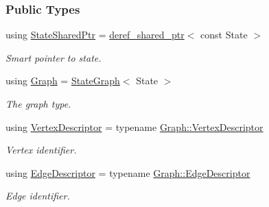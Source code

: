 \subsubsection*{Public Types}
\begin{DoxyCompactItemize}
\item 
using \hyperlink{structslb_1_1core_1_1ui_1_1CurrentStyles_a2e3a5865892f484dcf9c94ac70bc19c2}{State\+Shared\+Ptr} = \hyperlink{classslb_1_1core_1_1util_1_1deref__shared__ptr}{deref\+\_\+shared\+\_\+ptr}$<$ const State $>$\hypertarget{structslb_1_1core_1_1ui_1_1CurrentStyles_a2e3a5865892f484dcf9c94ac70bc19c2}{}\label{structslb_1_1core_1_1ui_1_1CurrentStyles_a2e3a5865892f484dcf9c94ac70bc19c2}

\begin{DoxyCompactList}\small\item\em Smart pointer to state. \end{DoxyCompactList}\item 
using \hyperlink{structslb_1_1core_1_1ui_1_1CurrentStyles_ac27c6fba620b638233a5c620f68c89bc}{Graph} = \hyperlink{structslb_1_1core_1_1ui_1_1StateGraph}{State\+Graph}$<$ State $>$\hypertarget{structslb_1_1core_1_1ui_1_1CurrentStyles_ac27c6fba620b638233a5c620f68c89bc}{}\label{structslb_1_1core_1_1ui_1_1CurrentStyles_ac27c6fba620b638233a5c620f68c89bc}

\begin{DoxyCompactList}\small\item\em The graph type. \end{DoxyCompactList}\item 
using \hyperlink{structslb_1_1core_1_1ui_1_1CurrentStyles_a5da5348d833acc6d19d20556f00765b9}{Vertex\+Descriptor} = typename \hyperlink{structslb_1_1core_1_1ui_1_1StateGraph_ab2d88fce7d30dc6346910900212a7e6d}{Graph\+::\+Vertex\+Descriptor}\hypertarget{structslb_1_1core_1_1ui_1_1CurrentStyles_a5da5348d833acc6d19d20556f00765b9}{}\label{structslb_1_1core_1_1ui_1_1CurrentStyles_a5da5348d833acc6d19d20556f00765b9}

\begin{DoxyCompactList}\small\item\em Vertex identifier. \end{DoxyCompactList}\item 
using \hyperlink{structslb_1_1core_1_1ui_1_1CurrentStyles_aa63947c6380258a6f5147c75d3168e2a}{Edge\+Descriptor} = typename \hyperlink{structslb_1_1core_1_1ui_1_1StateGraph_a7e894f002383b1687652a91549c3656d}{Graph\+::\+Edge\+Descriptor}\hypertarget{structslb_1_1core_1_1ui_1_1CurrentStyles_aa63947c6380258a6f5147c75d3168e2a}{}\label{structslb_1_1core_1_1ui_1_1CurrentStyles_aa63947c6380258a6f5147c75d3168e2a}

\begin{DoxyCompactList}\small\item\em Edge identifier. \end{DoxyCompactList}\end{DoxyCompactItemize}
